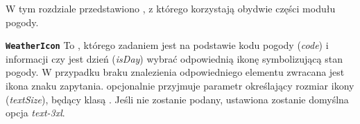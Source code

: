 \label{subsubsec:komponent-wspolny}

W tym rozdziale przedstawiono , z którego korzystają obydwie części modułu pogody.


\textbf{\texttt{WeatherIcon}}
To , którego zadaniem jest na podstawie kodu pogody (\emph{code}) i informacji czy
jest dzień (\emph{isDay}) wybrać odpowiednią ikonę symbolizującą stan pogody.
W przypadku braku znalezienia odpowiedniego elementu zwracana jest ikona znaku zapytania.
 opcjonalnie przyjmuje parametr określający rozmiar ikony (\emph{textSize}), będący klasą .
Jeśli nie zostanie podany, ustawiona zostanie domyślna opcja \emph{text-3xl}.
